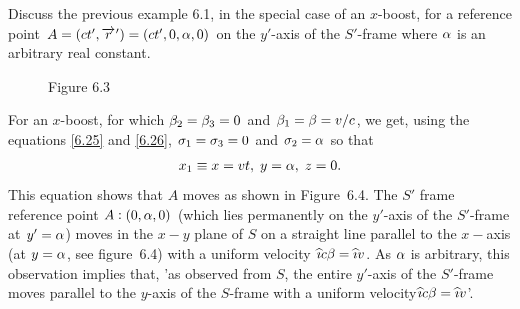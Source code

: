 \exm Discuss the previous example 6.1, in the special 
case 
of an $x$-boost, for a reference point $A=(ct', 
{\overrightarrow{r}\hspace*{.3pt}'})  =(ct', 0, {\alpha},0)$ on the $y'$-axis of the 
$S'$-frame where ${\alpha}$ is an arbitrary real constant.

\soln 
 
\begin{figure}[H]
\begin{center}
\caption*{Figure 6.3}\label{fig6.3}
\end{center}
\end{figure}
For an $x$-boost, for which ${\beta}_2={\beta}_3=0$ and 
${\beta}_1={\beta}=v/c$, we get, using the equations 
\eqref{6.25} 
and \eqref{6.26},  ${\sigma}_1={\sigma}_3=0$ and ${\sigma}_2={\alpha}$ 
so that
\begin{align}
\label{6.27} x_1\equiv x= vt,\; y={\alpha},\; z= 0.
\end{align}
This equation shows that $A$ moves as shown in 
Figure~6.4. 
The $S'$ frame reference point  $A:(0, {\alpha},0)$ (which 
lies 
permanently on the $y'$-axis of the $S'$-frame at $y'= 
{\alpha}$) moves in the $x-y$ plane of $S$ on a straight 
line 
parallel to the $x-$axis (at $y= {\alpha}$, see 
figure~6.4) 
with a uniform velocity ${\widehat{\imath}} c{\beta}={\widehat{\imath}} v$. As ${\alpha}$ 
is 
arbitrary, this observation implies that, 'as observed 
from 
$S$, the entire $y'$-axis of the $S'$-frame moves 
parallel 
to the $y$-axis of the $S$-frame with a uniform 
velocity\lbk  ${\widehat{\imath}} c{\beta}={\widehat{\imath}} v$'.\ebx

